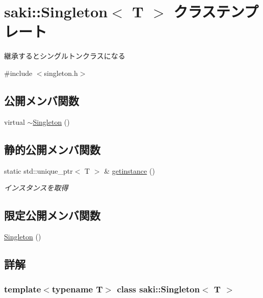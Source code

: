 \hypertarget{classsaki_1_1_singleton}{}\section{saki\+:\+:Singleton$<$ T $>$ クラステンプレート}
\label{classsaki_1_1_singleton}


継承するとシングルトンクラスになる  




{\ttfamily \#include $<$singleton.\+h$>$}

\subsection*{公開メンバ関数}
\begin{DoxyCompactItemize}
\item 
virtual \mbox{\hyperlink{classsaki_1_1_singleton_a3ff92ba5c83fba36d539cfa16d35599a}{$\sim$\+Singleton}} ()
\end{DoxyCompactItemize}
\subsection*{静的公開メンバ関数}
\begin{DoxyCompactItemize}
\item 
static std\+::unique\+\_\+ptr$<$ T $>$ \& \mbox{\hyperlink{classsaki_1_1_singleton_a198911b1e5a72914511ffd6f50e4da2f}{getinstance}} ()
\begin{DoxyCompactList}\small\item\em インスタンスを取得 \end{DoxyCompactList}\end{DoxyCompactItemize}
\subsection*{限定公開メンバ関数}
\begin{DoxyCompactItemize}
\item 
\mbox{\hyperlink{classsaki_1_1_singleton_a1cd9f69783e3c0c83db851edc061bb7f}{Singleton}} ()
\end{DoxyCompactItemize}


\subsection{詳解}
\subsubsection*{template$<$typename T$>$\newline
class saki\+::\+Singleton$<$ T $>$}

